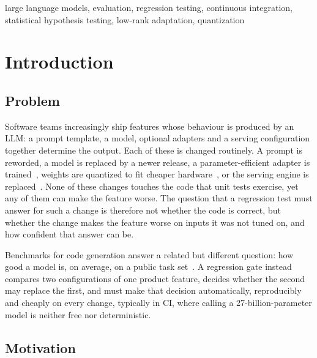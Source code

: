 \documentclass[conference]{IEEEtran}
\begin{document}
\begin{IEEEkeywords}
large language models, evaluation, regression testing, continuous integration, statistical hypothesis testing, low-rank adaptation, quantization
\end{IEEEkeywords}

\section{Introduction}
\label{sec:intro}

\subsection{Problem}
\label{sec:intro-problem}

Software teams increasingly ship features whose behaviour is produced by an LLM: a prompt template, a model, optional adapters and a serving configuration together determine the output. Each of these is changed routinely. A prompt is reworded, a model is replaced by a newer release, a parameter-efficient adapter is trained~\cite{hu2022lora}, weights are quantized to fit cheaper hardware~\cite{frantar2023gptq,ma2024bitnet}, or the serving engine is replaced~\cite{kwon2023vllm,llamacpp}. None of these changes touches the code that unit tests exercise, yet any of them can make the feature worse. The question that a regression test must answer for such a change is therefore not whether the code is correct, but whether the change makes the feature worse on inputs it was not tuned on, and how confident that answer can be.

Benchmarks for code generation answer a related but different question: how good a model is, on average, on a public task set~\cite{chen2021codex,austin2021mbpp,jimenez2024swebench}. A regression gate instead compares two configurations of one product feature, decides whether the second may replace the first, and must make that decision automatically, reproducibly and cheaply on every change, typically in CI, where calling a 27-billion-parameter model is neither free nor deterministic.

\subsection{Motivation}
\label{sec:intro-motivation}
\end{document}
